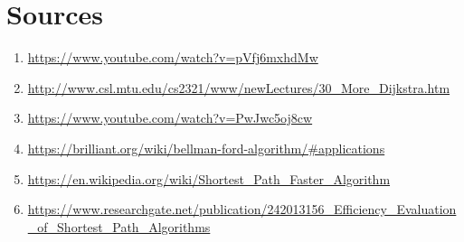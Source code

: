 \documentclass{article}
\begin{document}
\section{Sources}
\begin{enumerate}
    \item \url{https://www.youtube.com/watch?v=pVfj6mxhdMw}  
    \item \url{http://www.csl.mtu.edu/cs2321/www/newLectures/30_More_Dijkstra.htm}
    \item \url{https://www.youtube.com/watch?v=PwJwc5oj8cw}
    \item \url{https://brilliant.org/wiki/bellman-ford-algorithm/#applications}
    \item \url{https://en.wikipedia.org/wiki/Shortest_Path_Faster_Algorithm}
    \item \url{https://www.researchgate.net/publication/242013156_Efficiency_Evaluation_of_Shortest_Path_Algorithms}
\end{enumerate}




\end{document}
